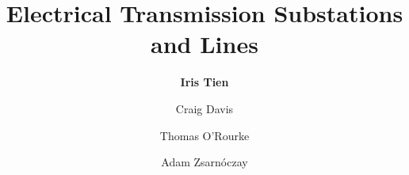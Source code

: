 %
%
%


%
%
%
%
%
%
%
%

\title{Electrical Transmission Substations and Lines}
\author{
    \textbf{Iris Tien}
    \and {Craig Davis}
    \and {Thomas O'Rourke}
    \and {Adam Zsarnóczay}}
\tocauthor{}
%
%
\maketitle
\label{chapter:perf_power}


